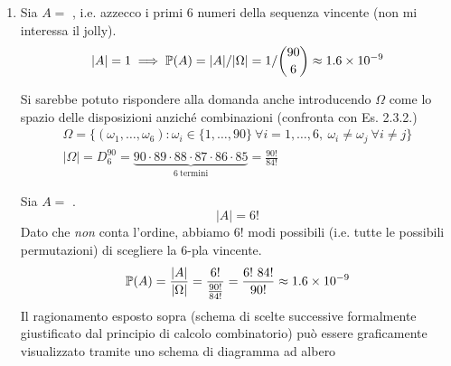 \begin{enumerate}
	\item Sia $A=$ , i.e. azzecco i primi $6$ numeri della sequenza vincente (non mi interessa il jolly).
	\begin{equation*}
		| A| =1\implies \PP(A) =| A| /| \Omega | =1/\binom{90}{6} \approx 1.6\times 10^{-9}
	\end{equation*}

	\begin{oss}
		Si sarebbe potuto rispondere alla domanda anche introducendo $\Omega $ come lo spazio delle disposizioni anziché combinazioni (confronta con Es. 2.3.2.)
		\begin{gather*}
			\Omega =\{(\omega_{1} ,\dots ,\omega_{6}) :\omega_{i} \in \{1,\dots,90\} \ \forall i=1,\dots,6,\ \omega_{i} \neq \omega_{j} \ \forall i\neq j\}\\
			| \Omega | =D_{6}^{90} =\underbrace{90\cdot 89\cdot 88\cdot 87\cdot 86\cdot 85}_{6\ \text{termini}} =\frac{90!}{84!}
		\end{gather*}
	\end{oss}

	Sia $A=$ .
	\begin{equation*}
		| A| =6!
	\end{equation*}
	Dato che \textit{non} conta l'ordine, abbiamo $6!$ modi possibili (i.e. tutte le possibili permutazioni) di scegliere la $6$-pla vincente.
	\begin{equation*}
		\PP(A) =\frac{| A| }{| \Omega | } =\frac{6!}{\frac{90!}{84!}} =\frac{6!\ 84!}{90!} \approx 1.6\times 10^{-9}
	\end{equation*}
	Il ragionamento esposto sopra (schema di scelte successive formalmente giustificato dal principio di calcolo combinatorio) può essere graficamente visualizzato tramite uno schema di diagramma ad albero


	\begin{tikzpicture}[x=0.75pt,y=0.75pt,yscale=-1,xscale=1]


\end{tikzpicture}
\end{enumerate}

